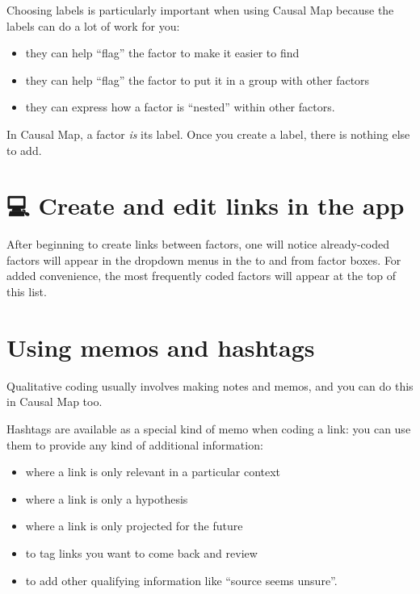 \documentclass[
]{book}
\providecommand{\tightlist}{%
  \setlength{\itemsep}{0pt}\setlength{\parskip}{0pt}}
\begin{document}
Choosing labels is particularly important when using Causal Map because the labels can do a lot of work for you:

\begin{itemize}
\item
  they can help ``flag'' the factor to make it easier to find
\item
  they can help ``flag'' the factor to put it in a group with other factors
\item
  they can express how a factor is ``nested'' within other factors.
\end{itemize}

In Causal Map, a factor \emph{is} its label. Once you create a label, there is nothing else to add.

\hypertarget{create-and-edit-links-in-the-app}{%
\section{💻 Create and edit links in the app}\label{create-and-edit-links-in-the-app}}

After beginning to create links between factors, one will notice already-coded factors will appear in the dropdown menus in the to and from factor boxes. For added convenience, the most frequently coded factors will appear at the top of this list.

\hypertarget{using-memos-and-hashtags}{%
\section{Using memos and hashtags}\label{using-memos-and-hashtags}}

Qualitative coding usually involves making notes and memos, and you can do this in Causal Map too.

Hashtags are available as a special kind of memo when coding a link: you can use them to provide any kind of additional information:

\begin{itemize}
\tightlist
\item
  where a link is only relevant in a particular context
\item
  where a link is only a hypothesis
\item
  where a link is only projected for the future
\item
  to tag links you want to come back and review
\item
  to add other qualifying information like ``source seems unsure''.
\end{itemize}
\end{document}
